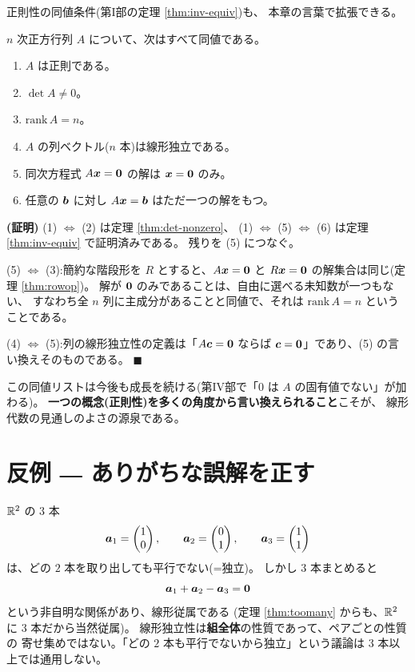 正則性の同値条件(第I部の定理 \ref{thm:inv-equiv})も、
本章の言葉で拡張できる。

\begin{teiri}\label{thm:reg-rank}
$n$ 次正方行列 $A$ について、次はすべて同値である。
\begin{enumerate}
\item $A$ は正則である。
\item $\det A \neq 0$。
\item $\mathrm{rank}\,A = n$。
\item $A$ の列ベクトル($n$ 本)は線形独立である。
\item 同次方程式 $A\bm{x} = \bm{0}$ の解は $\bm{x} = \bm{0}$ のみ。
\item 任意の $\bm{b}$ に対し $A\bm{x} = \bm{b}$ はただ一つの解をもつ。
\end{enumerate}
\end{teiri}

\noindent\textbf{(証明)}\quad
(1) $\iff$ (2) は定理 \ref{thm:det-nonzero}、
(1) $\iff$ (5) $\iff$ (6) は定理 \ref{thm:inv-equiv} で証明済みである。
残りを (5) につなぐ。

(5) $\iff$ (3):簡約な階段形を $R$ とすると、$A\bm{x} = \bm{0}$ と
$R\bm{x} = \bm{0}$ の解集合は同じ(定理 \ref{thm:rowop})。
解が $\bm{0}$ のみであることは、自由に選べる未知数が一つもない、
すなわち全 $n$ 列に主成分があることと同値で、それは
$\mathrm{rank}\,A = n$ ということである。

(4) $\iff$ (5):列の線形独立性の定義は「$A\bm{c} = \bm{0}$ ならば
$\bm{c} = \bm{0}$」であり、(5) の言い換えそのものである。
 $\blacksquare$

この同値リストは今後も成長を続ける(第IV部で「$0$ は $A$ の固有値でない」が加わる)。
\textbf{一つの概念(正則性)を多くの角度から言い換えられること}こそが、
線形代数の見通しのよさの源泉である。

\section{反例 ― ありがちな誤解を正す}

\begin{hanrei}\label{hanrei:pairwise}
$\mathbb{R}^2$ の $3$ 本
\[
\bm{a}_1 = \begin{pmatrix}1 \\ 0\end{pmatrix}, \qquad \bm{a}_2 = \begin{pmatrix}0 \\ 1\end{pmatrix}, \qquad
\bm{a}_3 = \begin{pmatrix}1 \\ 1\end{pmatrix}
\]
は、どの $2$ 本を取り出しても平行でない(=独立)。
しかし $3$ 本まとめると
\[
\bm{a}_1 + \bm{a}_2 - \bm{a}_3 = \bm{0}
\]
という非自明な関係があり、線形従属である
(定理 \ref{thm:toomany} からも、$\mathbb{R}^2$ に $3$ 本だから当然従属)。
線形独立性は\textbf{組全体}の性質であって、ペアごとの性質の
寄せ集めではない。「どの $2$ 本も平行でないから独立」という議論は
$3$ 本以上では通用しない。
\end{hanrei}

